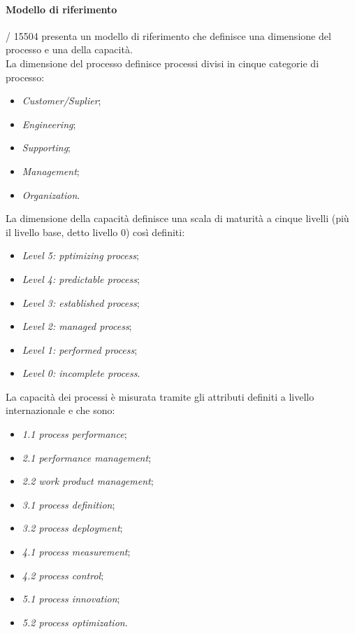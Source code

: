   \paragraph{Modello di riferimento}
  / 15504 presenta un modello di riferimento che definisce una dimensione del processo e una della capacità.\\
  La dimensione del processo definisce processi divisi in cinque categorie di processo:
  \begin{itemize}
    \item \emph{Customer/Suplier};
    \item \emph{Engineering};
    \item \emph{Supporting};
    \item \emph{Management};
    \item \emph{Organization}.
  \end{itemize}
  La dimensione della capacità definisce una scala di maturità a cinque livelli (più il livello base, detto livello 0) così definiti:
  \begin{itemize}
    \item \emph{Level 5: pptimizing process};
    \item \emph{Level 4: predictable process};
    \item \emph{Level 3: established process};
    \item \emph{Level 2: managed process};
    \item \emph{Level 1: performed process};
    \item \emph{Level 0: incomplete process}.
  \end{itemize}
  La capacità dei processi è misurata tramite gli attributi definiti a livello internazionale e che sono:
  \begin{itemize}
    \item \emph{1.1 process performance};
    \item \emph{2.1 performance management};
    \item \emph{2.2 work product management};
    \item \emph{3.1 process definition};
    \item \emph{3.2 process deployment};
    \item \emph{4.1 process measurement};
    \item \emph{4.2 process control};
    \item \emph{5.1 process innovation};
    \item \emph{5.2 process optimization}.
  \end{itemize}
